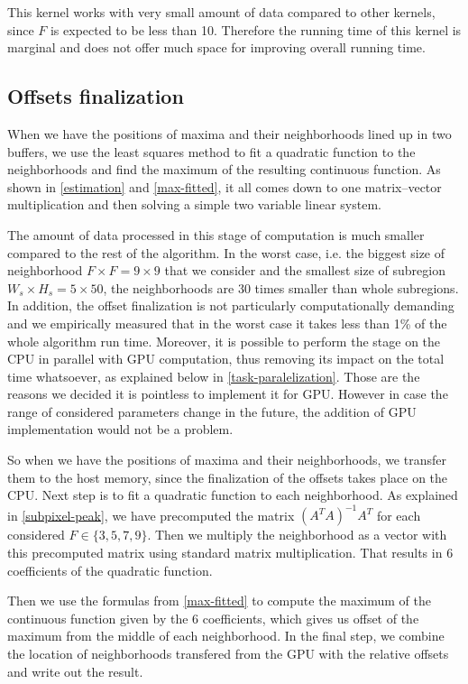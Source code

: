 This kernel works with very small amount of data compared to other kernels, since $F$ is expected to be less than 10. Therefore the running time of this kernel is marginal and does not offer much space for improving overall running time.


\subsection{Offsets finalization}
When we have the positions of maxima and their neighborhoods lined up in two buffers, we use the least squares method to fit a quadratic function to the neighborhoods and find the maximum of the resulting continuous function. As shown in \cref{estimation} and \cref{max-fitted}, it all comes down to one matrix--vector multiplication and then solving a simple two variable linear system.

The amount of data processed in this stage of computation is much smaller compared to the rest of the algorithm. In the worst case, i.e. the biggest size of neighborhood $F \times F = 9 \times 9$ that we consider and the smallest size of subregion $W_s \times H_s = 5 \times 50$, the neighborhoods are 30 times smaller than whole subregions. In addition, the offset finalization is not particularly computationally demanding and we empirically measured that in the worst case it takes less than 1\% of the whole algorithm run time. Moreover, it is possible to perform the stage on the CPU in parallel with GPU computation, thus removing its impact on the total time whatsoever, as explained below in \cref{task-paralelization}. Those are the reasons we decided it is pointless to implement it for GPU. However in case the range of considered parameters change in the future, the addition of GPU implementation would not be a problem.

So when we have the positions of maxima and their neighborhoods, we transfer them to the host memory, since the finalization of the offsets takes place on the CPU. Next step is to fit a quadratic function to each neighborhood. As explained in \cref{subpixel-peak}, we have precomputed the matrix $(A^TA)^{-1}A^T$ for each considered $F \in \{3, 5, 7, 9\}$. Then we multiply the neighborhood as a vector with this precomputed matrix using standard matrix multiplication. That results in 6 coefficients of the quadratic function.

Then we use the formulas from \cref{max-fitted} to compute the maximum of the continuous function given by the 6 coefficients, which gives us offset of the maximum from the middle of each neighborhood. In the final step, we combine the location of neighborhoods transfered from the GPU with the relative offsets and write out the result.


